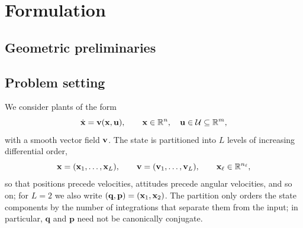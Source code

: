 \section{Formulation}\label{sec:formulation}


\subsection{Geometric preliminaries}\label{sec:preliminaries}


\subsection{Problem setting}\label{sec:problem}

We consider plants of the form
\begin{equation}\label{eq:plant}
    \dot{\mathbf{x}} = \mathbf{v}(\mathbf{x},\mathbf{u}), \qquad \mathbf{x} \in \mathbb{R}^n, \quad \mathbf{u} \in \mathcal{U} \subseteq \mathbb{R}^m,
\end{equation}
with a smooth vector field $\mathbf{v}$.
The state is partitioned into $L$ levels of increasing differential order,
\begin{equation}\label{eq:levels}
    \mathbf{x} = (\mathbf{x}_1,\dots,\mathbf{x}_L), \qquad \mathbf{v} = (\mathbf{v}_1,\dots,\mathbf{v}_L), \qquad \mathbf{x}_\ell \in \mathbb{R}^{n_\ell},
\end{equation}
so that positions precede velocities, attitudes precede angular velocities, and so on; for $L = 2$
we also write $(\mathbf{q},\mathbf{p}) = (\mathbf{x}_1,\mathbf{x}_2)$.
The partition only orders the state components by the number of integrations that separate them
from the input; in particular, $\mathbf{q}$ and $\mathbf{p}$ need not be canonically conjugate.

